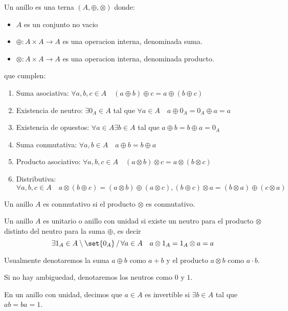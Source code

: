 \begin{definition}
	Un anillo es una terna \((A, \oplus, \otimes )\) donde:
	\begin{itemize}
		\item \(A \) es un conjunto no vacio
		\item \(\oplus \colon A \times A \to A \) es una operacion interna, denominada suma.
		\item \(\otimes \colon A \times A \to A \) es una operacion interna, denominada producto.
	\end{itemize}
	que cumplen:
	\begin{enumerate}
		\item Suma asociativa: \(\forall  a,b,c \in A \quad (a \oplus b) \oplus c = a \oplus (b \oplus c )\)
		\item Existencia de neutro: \(\exists 0_A \in A \) tal que \(\forall a \in A \quad a \oplus 0_A = 0_A \oplus a = a \)
		\item Existencia de opuestos: \(\forall a \in A \exists  b \in A \) tal que \(a \oplus b = b \oplus a = 0_A \)
		\item Suma conmutativa: \(\forall a,b \in A \quad a \oplus b = b \oplus a \)
		\item Producto asociativo: \(\forall a,b,c \in A \quad (a\otimes b) \otimes c = a \otimes (b \otimes c )\)
		\item Distributiva: \(\forall a,b,c \in A \quad a\otimes(b \oplus c ) = (a \otimes b) \oplus (a \otimes c), (b \oplus c) \otimes a = (b \otimes a ) \oplus (c \otimes a)\)
	\end{enumerate}
\end{definition}
\begin{definition}
	Un anillo \(A \) es conmutativo si el producto \(\otimes \) es conmutativo.
\end{definition}
\begin{definition}
	Un anillo \(A \) es unitario o anillo con unidad si existe un neutro para el producto \(\otimes \) distinto del neutro para la suma \(\oplus \), es decir
	\[
		\exists 1_A \in A \setminus \set{0_A } \,/\, \forall a \in A \quad a \otimes 1_A = 1_A \otimes a = a
	\]
\end{definition}
Usualmente denotaremos la suma \(a \oplus b \) como \(a + b \) y el producto \(a \otimes b \) como \(a \cdot b \).

Si no hay ambiguedad, denotaremos los neutros como \(0 \) y \(1. \)

\begin{definition}
	En un anillo con unidad, decimos que \(a \in A \) es invertible si \(\exists  b \in A \) tal que \(ab = ba = 1 \).
\end{definition}

